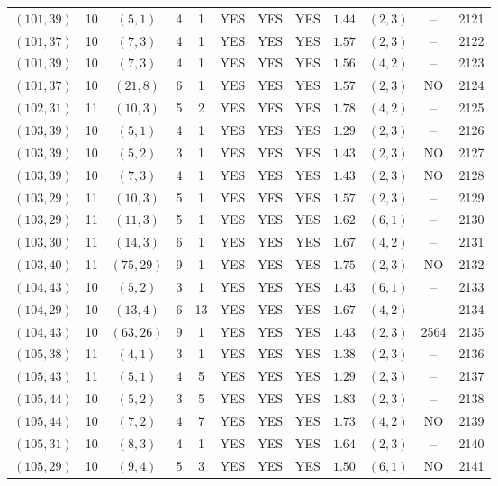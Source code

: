 \begin{longtable}{|c|c|c|c|c|c|c|c|c|c|c|c|}
$(101,39)$ & 10 & $(5,1)$ & 4 & 1 & YES & YES & YES & $1.44$ & $(2,3)$ & -- & 2121\\
$(101,37)$ & 10 & $(7,3)$ & 4 & 1 & YES & YES & YES & $1.57$ & $(2,3)$ & -- & 2122\\
$(101,39)$ & 10 & $(7,3)$ & 4 & 1 & YES & YES & YES & $1.56$ & $(4,2)$ & -- & 2123\\
$(101,37)$ & 10 & $(21,8)$ & 6 & 1 & YES & YES & YES & $1.57$ & $(2,3)$ & NO & 2124\\
$(102,31)$ & 11 & $(10,3)$ & 5 & 2 & YES & YES & YES & $1.78$ & $(4,2)$ & -- & 2125\\
$(103,39)$ & 10 & $(5,1)$ & 4 & 1 & YES & YES & YES & $1.29$ & $(2,3)$ & -- & 2126\\
$(103,39)$ & 10 & $(5,2)$ & 3 & 1 & YES & YES & YES & $1.43$ & $(2,3)$ & NO & 2127\\
$(103,39)$ & 10 & $(7,3)$ & 4 & 1 & YES & YES & YES & $1.43$ & $(2,3)$ & NO & 2128\\
$(103,29)$ & 11 & $(10,3)$ & 5 & 1 & YES & YES & YES & $1.57$ & $(2,3)$ & -- & 2129\\
$(103,29)$ & 11 & $(11,3)$ & 5 & 1 & YES & YES & YES & $1.62$ & $(6,1)$ & -- & 2130\\
$(103,30)$ & 11 & $(14,3)$ & 6 & 1 & YES & YES & YES & $1.67$ & $(4,2)$ & -- & 2131\\
$(103,40)$ & 11 & $(75,29)$ & 9 & 1 & YES & YES & YES & $1.75$ & $(2,3)$ & NO & 2132\\
$(104,43)$ & 10 & $(5,2)$ & 3 & 1 & YES & YES & YES & $1.43$ & $(6,1)$ & -- & 2133\\
$(104,29)$ & 10 & $(13,4)$ & 6 & 13 & YES & YES & YES & $1.67$ & $(4,2)$ & -- & 2134\\
$(104,43)$ & 10 & $(63,26)$ & 9 & 1 & YES & YES & YES & $1.43$ & $(2,3)$ & 2564 & 2135\\
$(105,38)$ & 11 & $(4,1)$ & 3 & 1 & YES & YES & YES & $1.38$ & $(2,3)$ & -- & 2136\\
$(105,43)$ & 11 & $(5,1)$ & 4 & 5 & YES & YES & YES & $1.29$ & $(2,3)$ & -- & 2137\\
$(105,44)$ & 10 & $(5,2)$ & 3 & 5 & YES & YES & YES & $1.83$ & $(2,3)$ & -- & 2138\\
$(105,44)$ & 10 & $(7,2)$ & 4 & 7 & YES & YES & YES & $1.73$ & $(4,2)$ & NO & 2139\\
$(105,31)$ & 10 & $(8,3)$ & 4 & 1 & YES & YES & YES & $1.64$ & $(2,3)$ & -- & 2140\\
$(105,29)$ & 10 & $(9,4)$ & 5 & 3 & YES & YES & YES & $1.50$ & $(6,1)$ & NO & 2141\\

\end{longtable}
